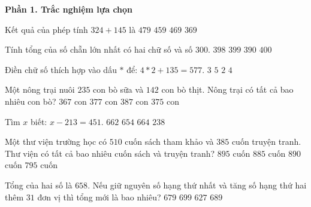 \textbf{Phần 1. Trắc nghiệm lựa chọn}

\begin{ex} %
Kết quả của phép tính $324 + 145$ là
\choice
{$479$}
{$459$}
{\True $469$}
{$369$}
\end{ex}

\begin{ex} %
Tính tổng của số chẵn lớn nhất có hai chữ số và số $300$.
\choice
{\True $398$}
{$399$}
{$390$}
{$400$}
\end{ex}

\begin{ex} %
Điền chữ số thích hợp vào dấu $*$ để: $4*2 + 135 = 577$.
\choice
{$3$}
{$5$}
{$2$}
{\True $4$}
\end{ex}

\begin{ex} %
Một nông trại nuôi $235$ con bò sữa và $142$ con bò thịt. Nông trại có tất cả bao nhiêu con bò?
\choice
{$367$ con}
{\True $377$ con}
{$387$ con}
{$375$ con}
\end{ex}

\begin{ex} %
Tìm $x$ biết: $x - 213 = 451$.
\choice
{$662$}
{$654$}
{\True $664$}
{$238$}
\end{ex}

\begin{ex} %
Một thư viện trường học có $510$ cuốn sách tham khảo và $385$ cuốn truyện tranh. Thư viện có tất cả bao nhiêu cuốn sách và truyện tranh?
\choice
{\True $895$ cuốn}
{$885$ cuốn}
{$890$ cuốn}
{$795$ cuốn}
\end{ex}

\begin{ex} %
Tổng của hai số là $658$. Nếu giữ nguyên số hạng thứ nhất và tăng số hạng thứ hai thêm $31$ đơn vị thì tổng mới là bao nhiêu?
\choice
{$679$}
{$699$}
{$627$}
{\True $689$}
\end{ex}

